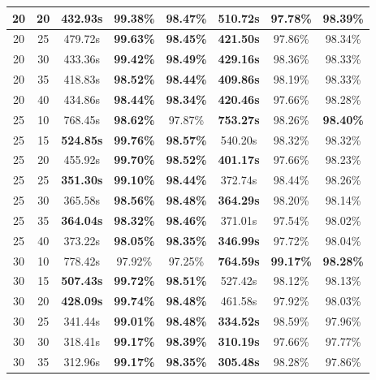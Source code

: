 \begin{table}
\begin{tabular}{|c|c|c|c|c|c|c|c|}
\hline
20 & 20 & \textbf{432.93s} & \textbf{99.38\%} & \textbf{98.47\%} & 510.72s & 97.78\% & 98.39\%  \\
\hline
20 & 25 & 479.72s & \textbf{99.63\%} & \textbf{98.45\%} & \textbf{421.50s} & 97.86\% & 98.34\%  \\
\hline
20 & 30 & 433.36s & \textbf{99.42\%} & \textbf{98.49\%} & \textbf{429.16s} & 98.36\% & 98.33\%  \\
\hline
20 & 35 & 418.83s & \textbf{98.52\%} & \textbf{98.44\%} & \textbf{409.86s} & 98.19\% & 98.33\%  \\
\hline
20 & 40 & 434.86s & \textbf{98.44\%} & \textbf{98.34\%} & \textbf{420.46s} & 97.66\% & 98.28\%  \\
\hline
25 & 10 & 768.45s & \textbf{98.62\%} & 97.87\% & \textbf{753.27s} & 98.26\% & \textbf{98.40\%}  \\
\hline
25 & 15 & \textbf{524.85s} & \textbf{99.76\%} & \textbf{98.57\%} & 540.20s & 98.32\% & 98.32\%  \\
\hline
25 & 20 & 455.92s & \textbf{99.70\%} & \textbf{98.52\%} & \textbf{401.17s} & 97.66\% & 98.23\%  \\
\hline
25 & 25 & \textbf{351.30s} & \textbf{99.10\%} & \textbf{98.44\%} & 372.74s & 98.44\% & 98.26\%  \\
\hline
25 & 30 & 365.58s & \textbf{98.56\%} & \textbf{98.48\%} & \textbf{364.29s} & 98.20\% & 98.14\%  \\
\hline
25 & 35 & \textbf{364.04s} & \textbf{98.32\%} & \textbf{98.46\%} & 371.01s & 97.54\% & 98.02\%  \\
\hline
25 & 40 & 373.22s & \textbf{98.05\%} & \textbf{98.35\%} & \textbf{346.99s} & 97.72\% & 98.04\%  \\
\hline
30 & 10 & 778.42s & 97.92\% & 97.25\% & \textbf{764.59s} & \textbf{99.17\%} & \textbf{98.28\%}  \\
\hline
30 & 15 & \textbf{507.43s} & \textbf{99.72\%} & \textbf{98.51\%} & 527.42s & 98.12\% & 98.13\%  \\
\hline
30 & 20 & \textbf{428.09s} & \textbf{99.74\%} & \textbf{98.48\%} & 461.58s & 97.92\% & 98.03\%  \\
\hline
30 & 25 & 341.44s & \textbf{99.01\%} & \textbf{98.48\%} & \textbf{334.52s} & 98.59\% & 97.96\%  \\
\hline
30 & 30 & 318.41s & \textbf{99.17\%} & \textbf{98.39\%} & \textbf{310.19s} & 97.66\% & 97.77\%  \\
\hline
30 & 35 & 312.96s & \textbf{99.17\%} & \textbf{98.35\%} & \textbf{305.48s} & 98.28\% & 97.86\%  \\

\end{tabular}
\end{table}
